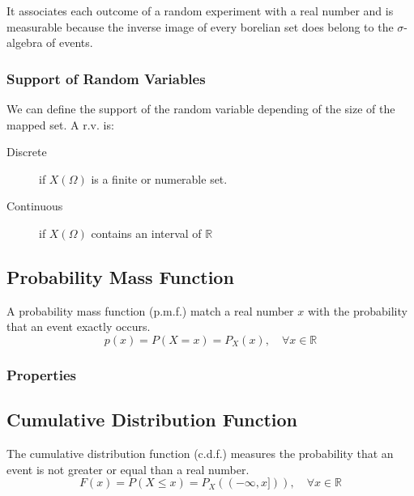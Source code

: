 It associates each outcome of a random experiment with a real number and is
measurable because the inverse image of every borelian set does belong to the
$\sigma$-algebra of events.

\subsubsection{Support of Random Variables} %
\label{ssub:support_of_random_variables}

We can define the support of the random variable depending of the size of the
mapped set. A r.v. is:
\begin{description}
    \item[Discrete] if $X(\Omega)$ is a finite or numerable set.
    \item[Continuous] if $X(\Omega)$ contains an interval of
    $\mathbb{R}$
\end{description}

\subsection{Probability Mass Function} %
\label{sub:probability_mass_function}

A probability mass function (p.m.f.) match a real number $x$ with the
probability that an event exactly occurs.
\begin{equation*}
    p(x)=P(X=x)=P_X(x), \quad\forall x\in \mathbb{R}
\end{equation*}


\subsubsection{Properties} %
\label{ssub:properties01}


\subsection{Cumulative Distribution Function} %
\label{sub:cumulative_distribution_function}

The cumulative distribution function (c.d.f.) measures the probability that an
event is not greater or equal than a real number.
\begin{equation*}
    F(x) = P(X\leq x) = P_X((-\infty,x])), \quad\forall x \in \mathbb{R}
\end{equation*}

